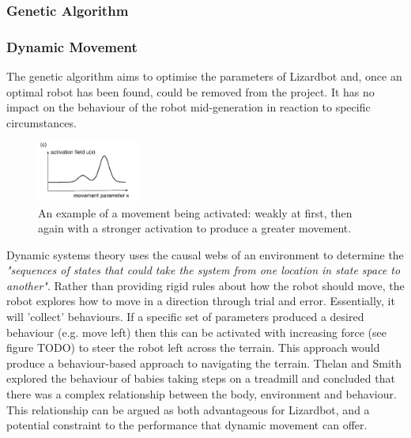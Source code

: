 \documentclass{article}
\begin{document}
\subsubsection{Genetic Algorithm}


\subsubsection{Dynamic Movement}
The genetic algorithm aims to optimise the parameters of Lizardbot and, once an optimal robot has been found, could be removed from the project. It has no impact on the behaviour of the robot mid-generation in reaction to specific circumstances.\\
\begin{figure}
    \centering
    \vspace*{-5mm}
    \includegraphics[width=0.3\textwidth]{activationExample}
    \caption{An example of a movement being activated: weakly at first, then again with a stronger activation to produce a greater movement. \citep{dft}}
\end{figure}
Dynamic systems theory uses the causal webs of an environment to determine the \textit{"sequences of states that could take the system from one location in state space to another"}. 
Rather than providing rigid rules about how the robot should move, the robot explores how to move in a direction through trial and error. Essentially, it will 'collect' behaviours. If a specific set of parameters produced a desired behaviour (e.g. move left) then this can be activated with increasing force (see figure TODO) to steer the robot left across the terrain. This approach would produce a behaviour-based approach to navigating the terrain. Thelan and Smith explored the behaviour of babies taking steps on a treadmill and concluded that there was a complex relationship between the body, environment and behaviour.  This relationship can be argued as both advantageous for Lizardbot, and a potential constraint to the performance that dynamic movement can offer.\\
\end{document}
